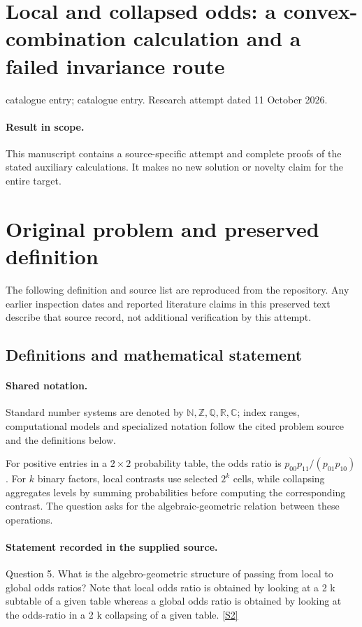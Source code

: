 \documentclass[11pt]{article}
\begin{document}
\section*{Local and collapsed odds: a convex-combination calculation and a failed invariance route}
\noindent catalogue entry; catalogue entry. Research attempt dated 11 October 2026.
\paragraph{Result in scope.}This manuscript contains a source-specific attempt and complete proofs of the stated auxiliary calculations. It makes no new solution or novelty claim for the entire target.
\section{Original problem and preserved definition}
The following definition and source list are reproduced from the repository. Any earlier inspection dates and reported literature claims in this preserved text describe that source record, not additional verification by this attempt.
\subsection{Definitions and mathematical statement}

\paragraph{Shared notation.}Standard number systems are denoted by $\mathbb N,\mathbb Z,\mathbb Q,\mathbb R,\mathbb C$; index ranges, computational models and specialized notation follow the cited problem source and the definitions below.


For positive entries in a $2\times2$ probability table, the odds ratio is $p_{00}p_{11}/(p_{01}p_{10})$. For $k$ binary factors, local contrasts use selected $2^k$ cells, while collapsing aggregates levels by summing probabilities before computing the corresponding contrast. The question asks for the algebraic-geometric relation between these operations.
\paragraph{Statement recorded in the supplied source.}
Question 5. What is the algebro-geometric structure of passing from local to global odds ratios? Note that local odds ratio is obtained by looking at a 2 k subtable of a given table whereas a global odds ratio is obtained by looking at the odds-ratio in a 2 k collapsing of a given table. \href{https://aimath.org/WWN/compalgstat/compalgstat.pdf}{[S2]}
\end{document}
